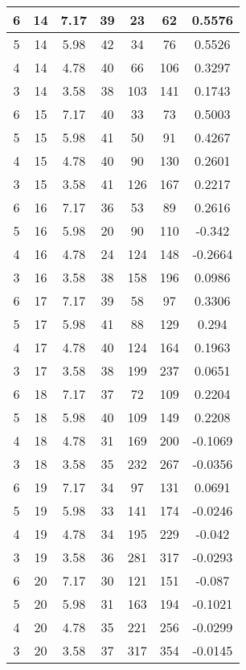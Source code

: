 \documentclass[letterpaper, 12pt]{article}
\begin{document}
\begin{longtable}{|c|c|c|c|c|c|c|}
\hline
6 & 14 & 7.17 & 39 & 23 & 62 & 0.5576 \\
\hline
5 & 14 & 5.98 & 42 & 34 & 76 & 0.5526 \\
\hline
4 & 14 & 4.78 & 40 & 66 & 106 & 0.3297 \\
\hline
3 & 14 & 3.58 & 38 & 103 & 141 & 0.1743 \\
\hline
6 & 15 & 7.17 & 40 & 33 & 73 & 0.5003 \\
\hline
5 & 15 & 5.98 & 41 & 50 & 91 & 0.4267 \\
\hline
4 & 15 & 4.78 & 40 & 90 & 130 & 0.2601 \\
\hline
3 & 15 & 3.58 & 41 & 126 & 167 & 0.2217 \\
\hline
6 & 16 & 7.17 & 36 & 53 & 89 & 0.2616 \\
\hline
5 & 16 & 5.98 & 20 & 90 & 110 & -0.342 \\
\hline
4 & 16 & 4.78 & 24 & 124 & 148 & -0.2664 \\
\hline
3 & 16 & 3.58 & 38 & 158 & 196 & 0.0986 \\
\hline
6 & 17 & 7.17 & 39 & 58 & 97 & 0.3306 \\
\hline
5 & 17 & 5.98 & 41 & 88 & 129 & 0.294 \\
\hline
4 & 17 & 4.78 & 40 & 124 & 164 & 0.1963 \\
\hline
3 & 17 & 3.58 & 38 & 199 & 237 & 0.0651 \\
\hline
6 & 18 & 7.17 & 37 & 72 & 109 & 0.2204 \\
\hline
5 & 18 & 5.98 & 40 & 109 & 149 & 0.2208 \\
\hline
4 & 18 & 4.78 & 31 & 169 & 200 & -0.1069 \\
\hline
3 & 18 & 3.58 & 35 & 232 & 267 & -0.0356 \\
\hline
6 & 19 & 7.17 & 34 & 97 & 131 & 0.0691 \\
\hline
5 & 19 & 5.98 & 33 & 141 & 174 & -0.0246 \\
\hline
4 & 19 & 4.78 & 34 & 195 & 229 & -0.042 \\
\hline
3 & 19 & 3.58 & 36 & 281 & 317 & -0.0293 \\
\hline
6 & 20 & 7.17 & 30 & 121 & 151 & -0.087 \\
\hline
5 & 20 & 5.98 & 31 & 163 & 194 & -0.1021 \\
\hline
4 & 20 & 4.78 & 35 & 221 & 256 & -0.0299 \\
\hline
3 & 20 & 3.58 & 37 & 317 & 354 & -0.0145 \\
\hline
\end{longtable}
\end{document}
